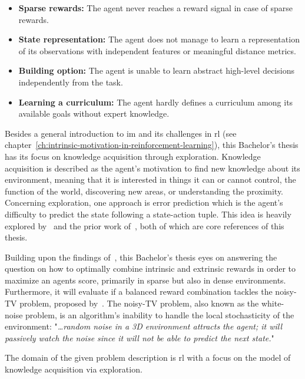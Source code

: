\documentclass[draft,final]{vutinfth} %
\newcommand{\p}[1]{see p. #1}
\begin{document}
    \begin{itemize}
        \item \textbf{Sparse rewards:} The agent never reaches a reward signal in case of sparse rewards.
        \item \textbf{State representation:} The agent does not manage to learn a representation of its observations with independent features or meaningful distance metrics.
        \item \textbf{Building option:} The agent is unable to learn abstract high-level decisions independently from the task.
        \item \textbf{Learning a curriculum:} The agent hardly defines a curriculum among its available goals without expert knowledge.
        \label{enm:challenges}
    \end{itemize}

    Besides a general introduction to \gls{im} and its challenges in \gls{rl} (see chapter~\ref{ch:intrinsic-motivation-in-reinforcement-learning}), this Bachelor's thesis has its focus on knowledge acquisition through exploration.
    Knowledge acquisition is described as the agent's motivation to find new knowledge about its environment, meaning that it is interested in things it can or cannot control, the function of the world, discovering new areas, or understanding the proximity.
    Concerning exploration, one approach is error prediction which is the agent's difficulty to predict the state following a state-action tuple.
    This idea is heavily explored by~\cite{burda_large-scale_2018-1} and the prior work of~\cite{pathak_curiosity-driven_2017-1}, both of which are core references of this thesis.

    Building upon the findings of~\citet{burda_large-scale_2018-1}, this Bachelor's thesis eyes on answering the question on how to optimally combine intrinsic and extrinsic rewards in order to maximize an agents score, primarily in sparse but also in dense environments.
    Furthermore, it will evaluate if a balanced reward combination tackles the noisy-TV problem, proposed by~\cite{schmidhuber_formal_2010}.
    The noisy-TV problem, also known as the white-noise problem, is an algorithm's inability to handle the local stochasticity of the environment: "\textit{\ldots random noise in a 3D environment attracts the agent; it will passively watch the noise since it will not be able to predict the next state.}"\cite[\p{10}]{aubret_survey_2019}

    The domain of the given problem description is \gls{rl} with a focus on the model of knowledge acquisition via exploration.
\end{document}
